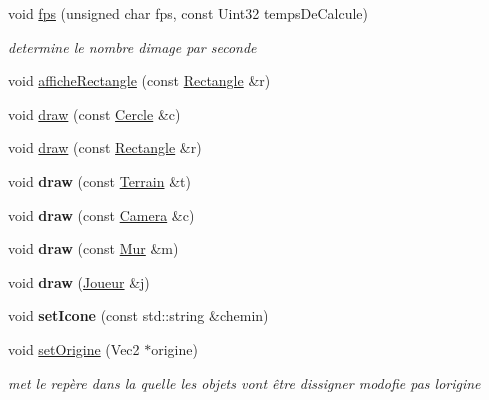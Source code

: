\begin{DoxyCompactItemize}
void \mbox{\hyperlink{class_fenetre_aa2272c38f9dcd34a4e819ab26d22d881}{fps}} (unsigned char fps, const Uint32 temps\+De\+Calcule)
\begin{DoxyCompactList}\small\item\em determine le nombre d\textquotesingle{}image par seconde \end{DoxyCompactList}\item 
void \mbox{\hyperlink{class_fenetre_ada8b47211931bbcd96d90a6951b6ac81}{affiche\+Rectangle}} (const \mbox{\hyperlink{class_rectangle}{Rectangle}} \&r)
\item 
void \mbox{\hyperlink{class_fenetre_a38f16af5be9a0283ab14dec00a8b5b9e}{draw}} (const \mbox{\hyperlink{class_cercle}{Cercle}} \&c)
\item 
void \mbox{\hyperlink{class_fenetre_a5d99f4f07fa6a89793f67303b98fb526}{draw}} (const \mbox{\hyperlink{class_rectangle}{Rectangle}} \&r)
\item 
\mbox{\label{class_fenetre_af793563adefc47c84b2245716c874241}} 
void {\bfseries draw} (const \mbox{\hyperlink{class_terrain}{Terrain}} \&t)
\item 
\mbox{\label{class_fenetre_a8334b347ee5515e003ed768a4de45044}} 
void {\bfseries draw} (const \mbox{\hyperlink{class_camera}{Camera}} \&c)
\item 
\mbox{\label{class_fenetre_a4415d03fcf553707e682475280808788}} 
void {\bfseries draw} (const \mbox{\hyperlink{class_mur}{Mur}} \&m)
\item 
\mbox{\label{class_fenetre_a833e8f2f7b25181553199a839c11e5c6}} 
void {\bfseries draw} (\mbox{\hyperlink{class_joueur}{Joueur}} \&j)
\item 
\mbox{\label{class_fenetre_ab0f36afaa322a834539623d89a5a9ce6}} 
void {\bfseries set\+Icone} (const std\+::string \&chemin)
\item 
\mbox{\label{class_fenetre_a6e56597205e2a4f5bd9d9c3b1c526139}} 
void \mbox{\hyperlink{class_fenetre_a6e56597205e2a4f5bd9d9c3b1c526139}{set\+Origine}} (Vec2 $\ast$origine)
\begin{DoxyCompactList}\small\item\em met le repère dans la quelle les objets vont être dissigner modofie pas l\textquotesingle{}origine \end{DoxyCompactList}\item 

\end{DoxyCompactItemize}
